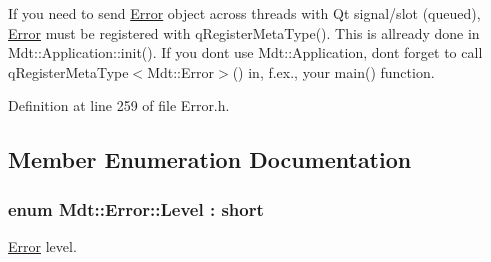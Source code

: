 If you need to send \hyperlink{class_mdt_1_1_error}{Error} object across threads with Qt signal/slot (queued), \hyperlink{class_mdt_1_1_error}{Error} must be registered with q\+Register\+Meta\+Type(). This is allready done in Mdt\+::\+Application\+::init(). If you don\textquotesingle{}t use Mdt\+::\+Application, don\textquotesingle{}t forget to call q\+Register\+Meta\+Type$<$\+Mdt\+::\+Error$>$() in, f.\+ex., your main() function. 

Definition at line 259 of file Error.\+h.



\subsection{Member Enumeration Documentation}
\subsubsection[{\texorpdfstring{Level}{Level}}]{\setlength{\rightskip}{0pt plus 5cm}enum {\bf Mdt\+::\+Error\+::\+Level} \+: short}\hypertarget{class_mdt_1_1_error_ab533dc690f68a8635232db594194a068}{}\label{class_mdt_1_1_error_ab533dc690f68a8635232db594194a068}


\hyperlink{class_mdt_1_1_error}{Error} level. 

